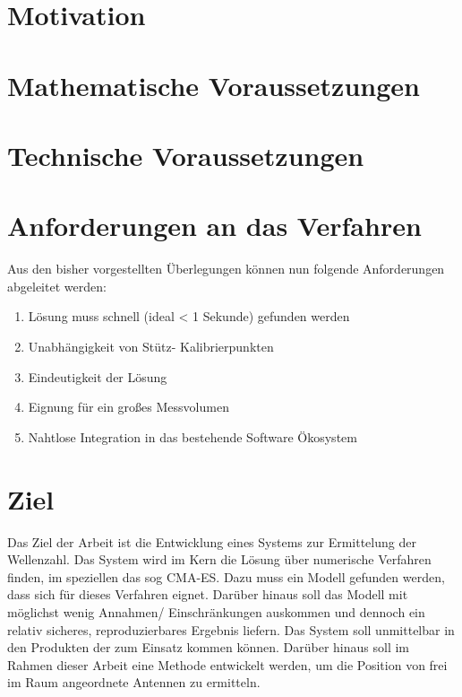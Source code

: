 %
\section[Motivation]{Motivation}

%
%
\section[mathematisches]{Mathematische Voraussetzungen}

%
%
\section[technisches]{Technische Voraussetzungen}

%
\section{Anforderungen an das Verfahren}
Aus den bisher vorgestellten Überlegungen können nun folgende Anforderungen abgeleitet werden:
%
\begin{enumerate}
	\item Lösung muss schnell (ideal < 1 Sekunde) gefunden werden
	\item Unabhängigkeit von Stütz- Kalibrierpunkten
	\item Eindeutigkeit der Lösung
	\item Eignung für ein großes Messvolumen
	\item Nahtlose Integration in das bestehende Software Ökosystem
%
\end{enumerate}
%
\section{Ziel}
%
Das Ziel der Arbeit ist die Entwicklung eines Systems zur Ermittelung der Wellenzahl. Das System wird im Kern die Lösung über numerische Verfahren finden, im speziellen das sog CMA-ES. Dazu muss ein Modell gefunden werden, dass sich für dieses Verfahren eignet. Darüber hinaus soll das Modell mit möglichst wenig Annahmen/ Einschränkungen auskommen und dennoch ein relativ sicheres, reproduzierbares Ergebnis liefern. Das System soll unmittelbar in den Produkten der \amedogmbh zum Einsatz kommen können. Darüber hinaus soll im Rahmen dieser Arbeit eine Methode entwickelt werden, um die Position von frei im Raum angeordnete Antennen zu ermitteln.
%
